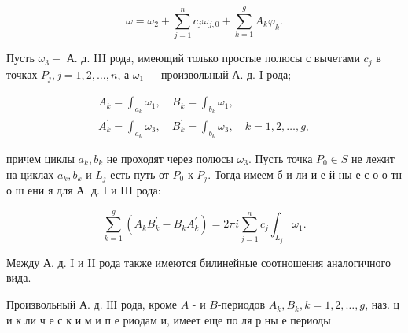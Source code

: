 \documentclass[10pt]{article}
\begin{document}
\[

\omega=\omega_{2}+\sum_{j=1}^{n} c_{j} \omega_{j, 0}+\sum_{k=1}^{g} A_{k} \varphi_{k} .

\]



Пусть $\omega_{3}-$ А. д. III рода, имеющий только простые полюсы с вычетами $c_{j}$ в точках $P_{j}, j=1,2, \ldots, n$, а $\omega_{1}-$ произвольный А. д. I рода;



\[

\begin{gathered}

A_{k}=\int_{a_{k}} \omega_{1}, \quad B_{k}=\int_{b_{k}} \omega_{1}, \\

A_{k}^{\prime}=\int_{a_{k}} \omega_{3}, \quad B_{k}^{\prime}=\int_{b_{k}} \omega_{3}, \quad k=1,2, \ldots, g,

\end{gathered}

\]



причем циклы $a_{k}, b_{k}$ не проходят через полюсы $\omega_{3}$. Пусть точка $P_{0} \in S$ не лежит на циклах $a_{k}, b_{k}$ и $L_{j}$ есть путь от $P_{0}$ к $P_{j}$. Тогда имеем б и ли и е й ны е с о о тн о ш ени я для А. д. І и III рода:



\[

\sum_{k=1}^{g}\left(A_{k} B_{k}^{\prime}-B_{k} A_{k}^{\prime}\right)=2 \pi i \sum_{j=1}^{n} c_{j} \int_{L_{j}} \omega_{1} .

\]



Между А. д. I и II рода также имеются билинейные соотношения аналогичного вида.



Произвольный А. д. ІІІ рода, кроме $A$ - и $B$-периодов $A_{k}, B_{k}, k=1,2, \ldots, g$, наз. ц и к ли ч е с к и м и п е риодам и, имеет еще по ля р ны е периоды
\end{document}

